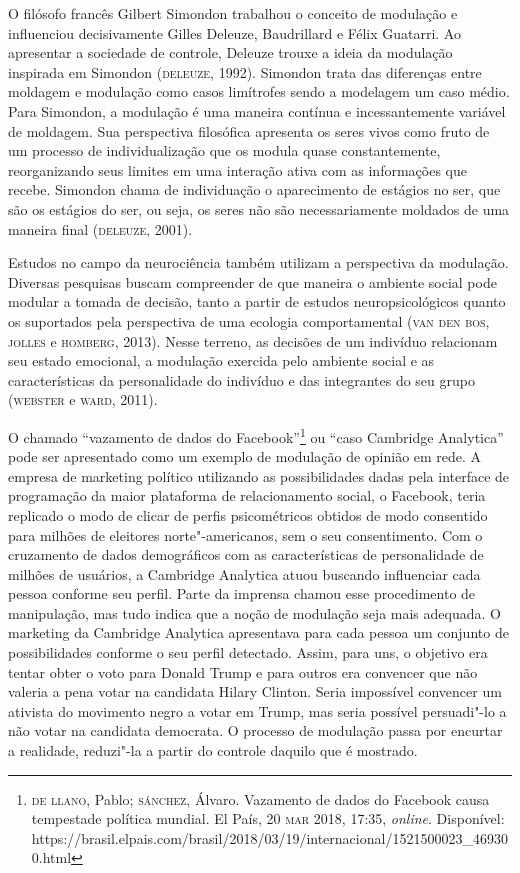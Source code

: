 O filósofo francês Gilbert Simondon trabalhou o conceito de modulação e
influenciou decisivamente Gilles Deleuze, Baudrillard e Félix Guatarri.
Ao apresentar a sociedade de controle, Deleuze trouxe a ideia da
modulação inspirada em Simondon (\textsc{deleuze}, 1992). Simondon trata das
diferenças entre moldagem e modulação como casos limítrofes sendo a
modelagem um caso médio. Para Simondon, a modulação é uma maneira
contínua e incessantemente variável de moldagem. Sua perspectiva
filosófica apresenta os seres vivos como fruto de um processo de
individualização que os modula quase constantemente, reorganizando seus
limites em uma interação ativa com as informações que recebe. Simondon
chama de individuação o aparecimento de estágios no ser, que são os
estágios do ser, ou seja, os seres não são necessariamente moldados de
uma maneira final (\textsc{deleuze}, 2001).

Estudos no campo da neurociência também utilizam a perspectiva da
modulação. Diversas pesquisas buscam compreender de que maneira o
ambiente social pode modular a tomada de decisão, tanto a partir de
estudos neuropsicológicos quanto os suportados pela perspectiva de uma
ecologia comportamental (\textsc{van den bos}, \textsc{jolles} e \textsc{homberg}, 2013). Nesse
terreno, as decisões de um indivíduo relacionam seu estado emocional, a
modulação exercida pelo ambiente social e as características da
personalidade do indivíduo e das integrantes do seu grupo (\textsc{webster} e
\textsc{ward}, 2011).

O chamado ``vazamento de dados do Facebook''\footnote{\textsc{de llano}, Pablo;
  \textsc{sánchez}, Álvaro. Vazamento de dados do Facebook causa tempestade
  política mundial. El País, 20 \textsc{mar} 2018, 17:35, \emph{\emph{online}}. Disponível:
  https://brasil.elpais.com/brasil/2018/03/19/internacional/1521500023\_469300.html}
ou ``caso Cambridge Analytica'' pode ser apresentado como um exemplo de
modulação de opinião em rede. A empresa de marketing político utilizando
as possibilidades dadas pela interface de programação da maior
plataforma de relacionamento social, o Facebook, teria replicado o modo
de clicar de perfis psicométricos obtidos de modo consentido para
milhões de eleitores norte"-americanos, sem o seu consentimento. Com o
cruzamento de dados demográficos com as características de personalidade
de milhões de usuários, a Cambridge Analytica atuou buscando influenciar
cada pessoa conforme seu perfil. Parte da imprensa chamou esse
procedimento de manipulação, mas tudo indica que a noção de modulação
seja mais adequada. O marketing da Cambridge Analytica apresentava para
cada pessoa um conjunto de possibilidades conforme o seu perfil
detectado. Assim, para uns, o objetivo era tentar obter o voto para
Donald Trump e para outros era convencer que não valeria a pena votar na
candidata Hilary Clinton. Seria impossível convencer um ativista do
movimento negro a votar em Trump, mas seria possível persuadi"-lo a não
votar na candidata democrata. O processo de modulação passa por encurtar
a realidade, reduzi"-la a partir do controle daquilo que é mostrado.


